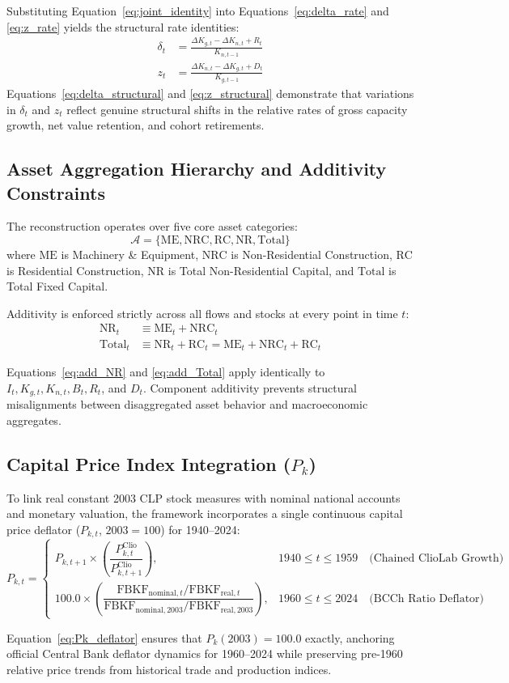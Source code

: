 Substituting Equation~\eqref{eq:joint_identity} into Equations~\eqref{eq:delta_rate} and \eqref{eq:z_rate} yields the structural rate identities:
\begin{align}
\delta_t &= \frac{\Delta K_{g,t} - \Delta K_{n,t} + R_t}{K_{n,t-1}} \label{eq:delta_structural} \\
z_t &= \frac{\Delta K_{n,t} - \Delta K_{g,t} + D_t}{K_{g,t-1}} \label{eq:z_structural}
\end{align}
Equations~\eqref{eq:delta_structural} and \eqref{eq:z_structural} demonstrate that variations in $\delta_t$ and $z_t$ reflect genuine structural shifts in the relative rates of gross capacity growth, net value retention, and cohort retirements.

\subsection{Asset Aggregation Hierarchy and Additivity Constraints}
The reconstruction operates over five core asset categories:
\begin{equation}
\mathcal{A} = \{\text{ME}, \text{NRC}, \text{RC}, \text{NR}, \text{Total}\}
\end{equation}
where $\text{ME}$ is Machinery \& Equipment, $\text{NRC}$ is Non-Residential Construction, $\text{RC}$ is Residential Construction, $\text{NR}$ is Total Non-Residential Capital, and $\text{Total}$ is Total Fixed Capital.

Additivity is enforced strictly across all flows and stocks at every point in time $t$:
\begin{align}
\text{NR}_t &\equiv \text{ME}_t + \text{NRC}_t \label{eq:add_NR} \\
\text{Total}_t &\equiv \text{NR}_t + \text{RC}_t = \text{ME}_t + \text{NRC}_t + \text{RC}_t \label{eq:add_Total}
\end{align}

Equations~\eqref{eq:add_NR} and \eqref{eq:add_Total} apply identically to $I_t, K_{g,t}, K_{n,t}, B_t, R_t$, and $D_t$. Component additivity prevents structural misalignments between disaggregated asset behavior and macroeconomic aggregates.

\subsection{Capital Price Index Integration ($P_k$)}
To link real constant 2003 CLP stock measures with nominal national accounts and monetary valuation, the framework incorporates a single continuous capital price deflator ($P_{k,t}$, $2003=100$) for 1940--2024:
\begin{equation}\label{eq:Pk_deflator}
P_{k,t} = \begin{cases}
P_{k,t+1} \times \left( \dfrac{P_{k,t}^{\text{Clio}}}{P_{k,t+1}^{\text{Clio}}} \right), & 1940 \le t \le 1959 \quad \text{(Chained ClioLab Growth)} \\
100.0 \times \left( \dfrac{\text{FBKF}_{\text{nominal},t} / \text{FBKF}_{\text{real},t}}{\text{FBKF}_{\text{nominal},2003} / \text{FBKF}_{\text{real},2003}} \right), & 1960 \le t \le 2024 \quad \text{(BCCh Ratio Deflator)}
\end{cases}
\end{equation}

Equation~\eqref{eq:Pk_deflator} ensures that $P_k(2003) = 100.0$ exactly, anchoring official Central Bank deflator dynamics for 1960--2024 while preserving pre-1960 relative price trends from historical trade and production indices.
